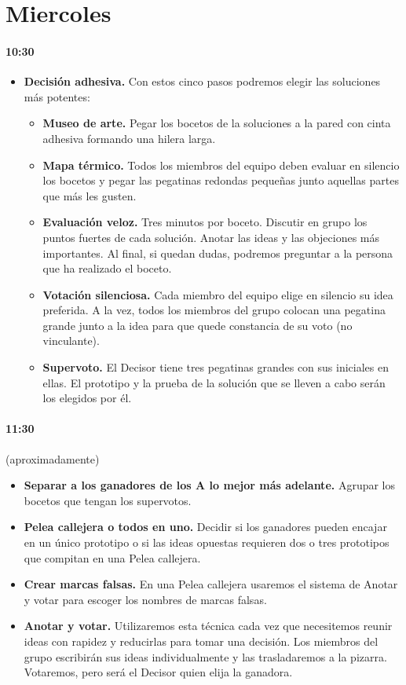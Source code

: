 \documentclass[10pt]{article}
\begin{document}
\section*{\center Miercoles}
\begin{multicols}{2}
\paragraph{10:30}
\begin{itemize}
\item \textbf{Decisión adhesiva.} Con estos cinco pasos podremos elegir las soluciones más potentes:
\begin{itemize}
\item \textbf{Museo de arte.} Pegar los bocetos de la soluciones a la pared con cinta adhesiva formando una hilera larga.
\item \textbf{Mapa térmico.} Todos los miembros del equipo deben evaluar en silencio los bocetos y pegar las pegatinas redondas pequeñas junto aquellas partes que más les gusten.
\item \textbf{Evaluación veloz.} Tres minutos por boceto. Discutir en grupo los puntos fuertes de cada solución. Anotar las ideas y las objeciones más importantes. Al final, si quedan dudas, podremos preguntar a la persona que ha realizado el boceto.
\item \textbf{Votación silenciosa.} Cada miembro del equipo elige en silencio su idea preferida. A la vez, todos los miembros del grupo colocan una pegatina grande junto a la idea para que quede constancia de su voto (no vinculante).
\item \textbf{Supervoto.} El Decisor tiene tres pegatinas grandes con sus iniciales en ellas. El prototipo y la prueba de la solución que se lleven a cabo serán los elegidos por él.
\end{itemize}
\end{itemize}
\paragraph{11:30}(aproximadamente)
\begin{itemize}
\item \textbf{Separar a los ganadores de los A lo mejor más adelante.}
Agrupar los bocetos que tengan los supervotos.
\item \textbf{Pelea callejera o todos en uno.} Decidir si los ganadores pueden encajar en un único prototipo o si las ideas opuestas requieren dos o tres prototipos que compitan en una Pelea callejera.
\item \textbf{Crear marcas falsas.} En una Pelea callejera usaremos el sistema de Anotar y votar para escoger los nombres de marcas falsas. 
\item \textbf{Anotar y votar.} Utilizaremos esta técnica cada vez que necesitemos reunir ideas con rapidez y reducirlas para tomar una decisión. Los miembros del grupo escribirán sus ideas individualmente y las trasladaremos a la pizarra. Votaremos, pero será el Decisor quien elija la ganadora.
\end{itemize}

\end{multicols}
\end{document}
